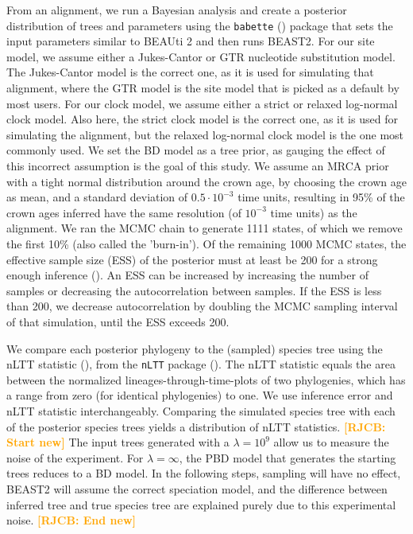 \documentclass{article}
\newcommand*\richel[1]{\textcolor{orange}{\textbf{[RJCB: #1]}}}
\begin{document}
From an alignment, we run a Bayesian analysis and 
create a posterior distribution of trees and parameters
using the \verb;babette; (\cite{babette}) package
that sets the input parameters similar to BEAUti 2 and then runs BEAST2. 
For our site model, we assume either a Jukes-Cantor or GTR nucleotide substitution model.
The Jukes-Cantor model is the correct one, as it is used for simulating that alignment,
where the GTR model is the site model that is picked as a default by most users.
For our clock model, we assume either a strict or relaxed log-normal 
clock model. 
Also here, the strict clock model is the correct one, as it is used for simulating the alignment,
but the relaxed log-normal clock model is the one most commonly used.
We set the BD model as a tree prior, 
as gauging the effect of this incorrect assumption is the goal of this study. 
We assume an MRCA prior with a tight normal distribution
around the crown age, by choosing the crown age as mean, and a standard deviation 
of $0.5 \cdot 10^{-3}$ time units,
resulting in 95\% of the crown ages inferred have the same resolution (of $10^{-3}$ time 
units) as the alignment. 
We ran the MCMC chain to generate 1111 states,
of which we remove the first 10\% (also called the 'burn-in'). 
Of the remaining
1000 MCMC states, the effective sample size (ESS) of the posterior 
must at least be 200
for a strong enough inference (\cite{beastbook}). An ESS can be increased by increasing
the number of samples or decreasing the autocorrelation between samples. 
If the ESS is less than 200, we decrease autocorrelation by doubling 
the MCMC sampling interval of that simulation, until the ESS exceeds 200.

We compare each posterior phylogeny to the (sampled) species tree
using the nLTT statistic (\cite{janzen2015}), from the \verb;nLTT; package (\cite{nltt}). 
The nLTT statistic equals the area between the normalized
lineages-through-time-plots of two phylogenies, which has a range 
from zero (for identical phylogenies) to one. We use inference error 
and nLTT statistic interchangeably. Comparing the simulated species tree
with each of the posterior species trees yields a distribution of nLTT statistics. 
\richel{Start new}
The input trees generated with a $\lambda = 10^9$ allow us to measure the noise of the experiment.
For $\lambda = \infty$, the PBD model that generates the starting trees reduces to a BD model.
In the following steps, sampling will have no effect, BEAST2 will assume the correct speciation model,
and the difference between inferred tree and true species tree are explained purely due to this experimental noise.
\richel{End new}
\end{document}
